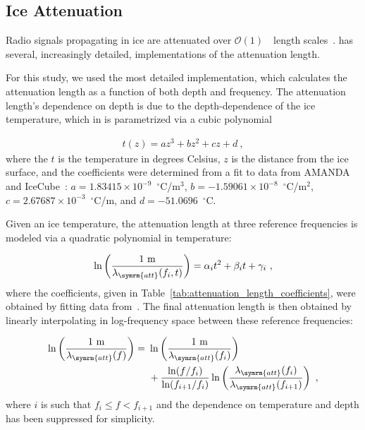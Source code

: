         \subsection{Ice Attenuation}
            Radio signals propagating in ice are attenuated over $\mathcal{O}(1)$~~length scales~\citep{SPice-attenuation}.
            \arasim{} has several, increasingly detailed, implementations of the attenuation length.

            For this study, we used the most detailed implementation, which calculates the attenuation length as a function of both depth and frequency.
            The attenuation length's dependence on depth is due to the depth-dependence of the ice temperature, which in \arasim{} is parametrized via a cubic polynomial

            \begin{align}
                t(z) = az^3 + bz^2 + cz + d~,
            \end{align}
            where the $t$ is the temperature in degrees Celsius, $z$ is the distance from the ice surface, and the coefficients were determined from a fit to data from AMANDA and IceCube~\citep{ice_temperature}: $a=1.83415\times 10^{-9}$~$^\circ$C/m$^3$, $b=-1.59061\times 10^{-8}$~$^\circ$C/m$^2$, $c=2.67687\times 10^{-3}$~$^\circ$C/m, and $d=-51.0696$~$^\circ$C.

            Given an ice temperature, the attenuation length at three reference frequencies is modeled via a quadratic polynomial in temperature:

        \begin{align}\label{eq:reference_attenuation_lengths}
                \ln\left(\frac{1~\text{m}}{\lambda_{\symrm{att}}(f_i,t)}\right) = \alpha_i t^2 + \beta_i t + \gamma_i~,
            \end{align}
            where the coefficients, given in Table~\ref{tab:attenuation_length_coefficients}, were obtained by fitting data from~\citep{bogorodsky2012radioglaciology}.
            The final attenuation length is then obtained by linearly interpolating in log-frequency space between these reference frequencies:

            \begin{align}
                \ln\left(\frac{1~\text{m}}{\lambda_{\symrm{att}}(f)}\right) =~ &\ln\left(\frac{1~\text{m}}{\lambda_{\symrm{att}}(f_i)}\right) \nonumber \\ &+ \frac{\ln(f/f_i)}{\ln(f_{i+1}/f_i)} \ln\left(\frac{\lambda_{\symrm{att}}(f_i)}{\lambda_{\symrm{att}}(f_{i+1})}\right) ~,
            \end{align}
            where $i$ is such that $f_i \leq f < f_{i+1}$ and the dependence on temperature and depth has been suppressed for simplicity.

